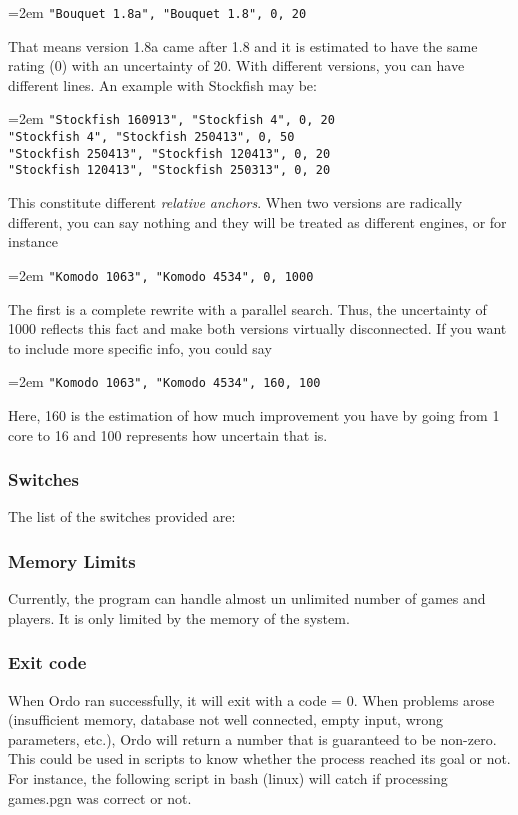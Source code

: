 \documentclass[12pt]{article}
\newcommand{\cmdln}[1]{
	\par
	\begingroup
		\leftskip=2em
		\addtolength{\rightskip}{0em}
		\noindent \small{\texttt{#1}}
		\par
	\endgroup
}
\newcommand{\inctxt}[1]{
	\begingroup
    \fontsize{9pt}{11pt}\selectfont
		 
	\endgroup
}
\begin{document}
\cmdln{"Bouquet 1.8a",    "Bouquet 1.8",   0, 20}

That means version 1.8a came after 1.8 and it is estimated to have the same rating (0) with an uncertainty of 20. 
With different versions, you can have different lines. An example with Stockfish may be:

\cmdln{"Stockfish 160913", "Stockfish 4",        0, 20\\
"Stockfish 4",      "Stockfish 250413",   0, 50\\
"Stockfish 250413", "Stockfish 120413",   0, 20\\
"Stockfish 120413", "Stockfish 250313",   0, 20}

This constitute different \textit{relative anchors}.
When two versions are radically different, you can say nothing and they will be treated as different engines, or for instance

\cmdln{"Komodo 1063",      "Komodo 4534",        0, 1000}

The first is a complete rewrite with a parallel search. Thus, the uncertainty of 1000 reflects this fact and make both versions virtually disconnected. 
If you want to include more specific info, you could say

\cmdln{"Komodo 1063",      "Komodo 4534",        160, 100}

Here, 160 is the estimation of how much improvement you have by going from 1 core to 16 and 100 represents how uncertain that is. 

\subsubsection*{Switches}

The list of the switches provided are:
\inctxt{tmp-switches.txt}

\subsubsection*{Memory Limits}
Currently, the program can handle almost un unlimited number of games and players. It is only limited by the memory of the system.

\subsubsection*{Exit code}
When Ordo ran successfully, it will exit with a code = 0. 
When problems arose (insufficient memory, database not well connected, empty input, wrong parameters, etc.), Ordo will return a number that is guaranteed to be non-zero.
This could be used in scripts to know whether the process reached its goal or not.
For instance, the following script in bash (linux) will catch if processing games.pgn was correct or not.
\end{document}
